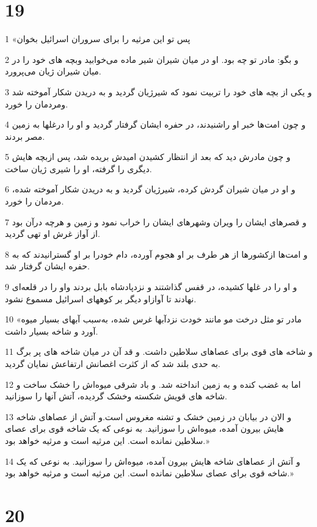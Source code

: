 \chapter{19}

\par 1 «پس تو این مرثیه را برای سروران اسرائیل بخوان
\par 2 و بگو: مادر تو چه بود. او در میان شیران شیر ماده می‌خوابید وبچه های خود را در میان شیران ژیان می‌پرورد.
\par 3 و یکی از بچه های خود را تربیت نمود که شیرژیان گردید و به دریدن شکار آموخته شد ومردمان را خورد.
\par 4 و چون امت‌ها خبر او راشنیدند، در حفره ایشان گرفتار گردید و او را درغلها به زمین مصر بردند.
\par 5 و چون مادرش دید که بعد از انتظار کشیدن امیدش بریده شد، پس ازبچه هایش دیگری را گرفته، او را شیری ژیان ساخت.
\par 6 و او در میان شیران گردش کرده، شیرژیان گردید و به دریدن شکار آموخته شده، مردمان را خورد.
\par 7 و قصرهای ایشان را ویران وشهرهای ایشان را خراب نمود و زمین و هرچه درآن بود از آواز غرش او تهی گردید.
\par 8 و امت‌ها ازکشورها از هر طرف بر او هجوم آورده، دام خودرا بر او گسترانیدند که به حفره ایشان گرفتار شد.
\par 9 و او را در غلها کشیده، در قفس گذاشتند و نزدپادشاه بابل بردند واو را در قلعه‌ای نهادند تا آوازاو دیگر بر کوههای اسرائیل مسموع نشود.
\par 10 «مادر تو مثل درخت مو مانند خودت نزدآبها غرس شده، به‌سبب آبهای بسیار میوه آورد و شاخه بسیار داشت.
\par 11 و شاخه های قوی برای عصاهای سلاطین داشت. و قد آن در میان شاخه های پر برگ به حدی بلند شد که از کثرت اغصانش ارتفاعش نمایان گردید.
\par 12 اما به غضب کنده و به زمین انداخته شد. و باد شرقی میوه‌اش را خشک ساخت و شاخه های قویش شکسته وخشک گردیده، آتش آنها را سوزانید.
\par 13 و الان در بیابان در زمین خشک و تشنه مغروس است.و آتش از عصاهای شاخه هایش بیرون آمده، میوه‌اش را سوزانید. به نوعی که یک شاخه قوی برای عصای سلاطین نمانده است. این مرثیه است و مرثیه خواهد بود.»
\par 14 و آتش از عصاهای شاخه هایش بیرون آمده، میوه‌اش را سوزانید. به نوعی که یک شاخه قوی برای عصای سلاطین نمانده است. این مرثیه است و مرثیه خواهد بود.»

\chapter{20}

